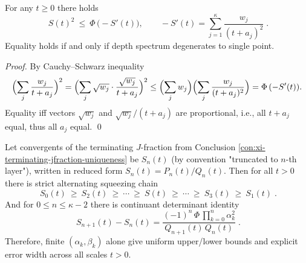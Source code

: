 \begin{proposition}\label{con:xi-scale-cauchy-schwarz}
For any \(t\ge 0\) there holds
\[
\boxed{\;
S(t)^2\ \le\ \Phi\,\bigl(-S'(t)\bigr),
\qquad
-S'(t)=\sum_{j=1}^{\kappa}\frac{w_j}{(t+a_j)^2}\; }.
\]
Equality holds if and only if depth spectrum degenerates to single point.
\end{proposition}
\begin{proof}
By Cauchy--Schwarz inequality
\[
\Bigl(\sum_j \frac{w_j}{t+a_j}\Bigr)^2
=\Bigl(\sum_j \sqrt{w_j}\cdot\frac{\sqrt{w_j}}{t+a_j}\Bigr)^2
\le \Bigl(\sum_j w_j\Bigr)\Bigl(\sum_j \frac{w_j}{(t+a_j)^2}\Bigr)
=\Phi\,(-S'(t)).
\]
Equality iff vectors \(\sqrt{w_j}\) and \(\sqrt{w_j}/(t+a_j)\) are proportional, i.e., all \(t+a_j\) equal, thus all \(a_j\) equal. \qed
\end{proof}

\begin{proposition}\label{con:xi-jfraction-convergents-alternating-bounds}
Let convergents of the terminating \texorpdfstring{$J$}{J}-fraction from Conclusion \ref{con:xi-terminating-jfraction-uniqueness} be \(S_n(t)\) (by convention "truncated to \(n\)-th layer"), written in reduced form \(S_n(t)=P_n(t)/Q_n(t)\).
Then for all \(t>0\) there is strict alternating squeezing chain
\[
\boxed{\;
S_0(t)\ \ge\ S_2(t)\ \ge\ \cdots\ \ge\ S(t)\ \ge\ \cdots\ \ge\ S_3(t)\ \ge\ S_1(t)\; }.
\]
And for \(0\le n\le \kappa-2\) there is continuant determinant identity
\[
\boxed{\;
S_{n+1}(t)-S_n(t)=
\frac{(-1)^n\,\Phi\,\prod_{k=0}^{n}\alpha_k^2}{Q_{n+1}(t)\,Q_{n}(t)}\; }.
\]
Therefore, finite \((\alpha_k,\beta_k)\) alone give uniform upper/lower bounds and explicit error width across all scales \(t>0\).
\end{proposition}

